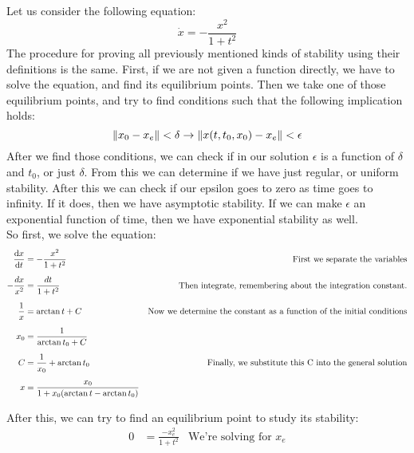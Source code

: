 \ex{}
{
    Let us consider the following equation:
    \begin{equation}
        \label{ex:kurwamac}
        \dot{x} = -\frac{x^{2}}{1+t^{2}}
    \end{equation}
    The procedure for proving all previously mentioned kinds of stability using their definitions is the same. First, if we are not given a function directly, we have to solve the equation, and find its equilibrium points. Then we take one of those equilibrium points, and try to find conditions such that the following implication holds:
    \begin{equation}
        \label{imp}
        \lVert x_0-x_e\rVert < \delta \rightarrow \lVert x(t,t_0,x_0) - x_e\rVert < \epsilon
    \end{equation}
    After we find those conditions, we can check if in our solution $\epsilon$ is a function of $\delta$ and $t_0$, or just $\delta$. From this we can determine if we have just regular, or uniform stability. After this we can check if our epsilon goes to zero as time goes to infinity. If it does, then we have asymptotic stability. If we can make $\epsilon$ an exponential function of time, then we have exponential stability as well.
    \\
    So first, we solve the equation:
    \begin{equation}
    \!\begin{aligned}
        \odv{x}{t} & = -\frac{x^{2}}{1+t^{2}} &\mbox{First we separate the variables}& \\[1.25ex]
        -\frac{dx}{x^{2}}&=\frac{dt}{1+t^{2}}&\mbox{Then integrate, remembering about the integration constant.}&\\[1.25ex]
        \frac{1}{x}&=\arctan{t}+C&\mbox{Now we determine the constant as a function of the initial conditions}\\[1.25ex]
            x_0&=\frac{1}{\arctan{t_0}+C}&\mbox{}\\[1.25ex]
            C&=\frac{1}{x_0}+\arctan{t_0}&\mbox{Finally, we substitute this C into the general solution}\\[1.25ex]
            x&=\frac{x_0}{1+x_0(\arctan{t}-\arctan{t_0})}&\mbox{}\\[1.25ex]
    \end{aligned}
    \end{equation}
    After this, we can try to find an equilibrium point to study its stability:
     \begin{align*}
        0&=\frac{-x_e^{2}}{1+t^{2}}&\mbox{We're solving for $x_e$}\\[1.25ex]

\end{align*}}
